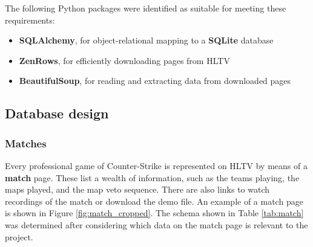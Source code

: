 The following Python packages were identified as suitable for meeting these requirements:
\begin{itemize}
\item{\textbf{SQLAlchemy}, for object-relational mapping to a \textbf{SQLite} database}
\item{\textbf{ZenRows}, for efficiently downloading pages from HLTV}
\item{\textbf{BeautifulSoup}, for reading and extracting data from downloaded pages}
\end{itemize} 


\subsection{Database design}


\subsubsection{Matches}

Every professional game of Counter-Strike is represented on HLTV by means of a \textbf{match} page. These list a wealth of information, such as the teams playing, the maps played, and the map veto sequence. There are also links to watch recordings of the match or download the demo file. An example of a match page is shown in Figure \ref{fig:match_cropped}. The schema shown in Table \ref{tab:match} was determined after considering which data on the match page is relevant to the project.

